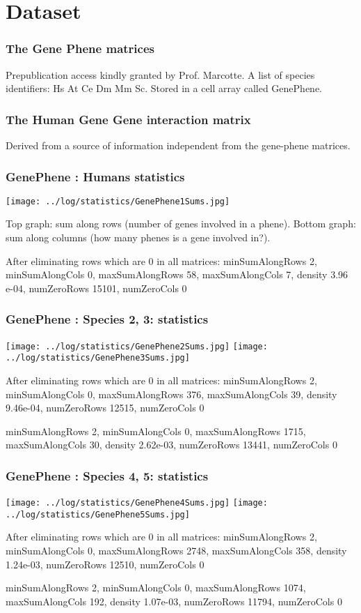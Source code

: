 \documentclass{beamer}
\begin{document}
\section{Dataset}
\begin{frame}
\frametitle{The Gene Phene matrices}
\begin{itemize}
\pitem Prepublication access kindly granted by Prof. Marcotte.
\pitem A list of species identifiers: Hs At Ce Dm Mm Sc.
\pitem Stored in a cell array called GenePhene.
\end{itemize}
\end{frame}

\begin{frame}
\frametitle{The Human Gene Gene interaction matrix}
\begin{itemize}
\pitem Derived from a source of information independent from the gene-phene matrices.
\end{itemize}
\end{frame}



\begin{frame}
\frametitle{GenePhene : Humans statistics}
\texttt{[image: ../log/statistics/GenePhene1Sums.jpg]}

Top graph: sum along rows (number of genes involved in a phene).
Bottom graph: sum along columns (how many phenes is a gene involved in?).

After eliminating rows which are 0 in all matrices:
minSumAlongRows 2, minSumAlongCols 0, maxSumAlongRows 58, maxSumAlongCols 7, density 3.96 e-04, numZeroRows 15101, numZeroCols 0


\end{frame}

\begin{frame}
\frametitle{GenePhene : Species 2, 3: statistics}
\texttt{[image: ../log/statistics/GenePhene2Sums.jpg]}
\texttt{[image: ../log/statistics/GenePhene3Sums.jpg]}

After eliminating rows which are 0 in all matrices:
minSumAlongRows 2, minSumAlongCols 0, maxSumAlongRows 376, maxSumAlongCols 39, density 9.46e-04, numZeroRows 12515, numZeroCols 0

minSumAlongRows 2, minSumAlongCols 0, maxSumAlongRows 1715, maxSumAlongCols 30, density 2.62e-03, numZeroRows 13441, numZeroCols 0

\end{frame}

\begin{frame}
\frametitle{GenePhene : Species 4, 5: statistics}
\texttt{[image: ../log/statistics/GenePhene4Sums.jpg]}
\texttt{[image: ../log/statistics/GenePhene5Sums.jpg]}

After eliminating rows which are 0 in all matrices:
minSumAlongRows 2, minSumAlongCols 0, maxSumAlongRows 2748, maxSumAlongCols 358, density 1.24e-03, numZeroRows 12510, numZeroCols 0

minSumAlongRows 2, minSumAlongCols 0, maxSumAlongRows 1074, maxSumAlongCols 192, density 1.07e-03, numZeroRows 11794, numZeroCols 0

\end{frame}
\end{document}
